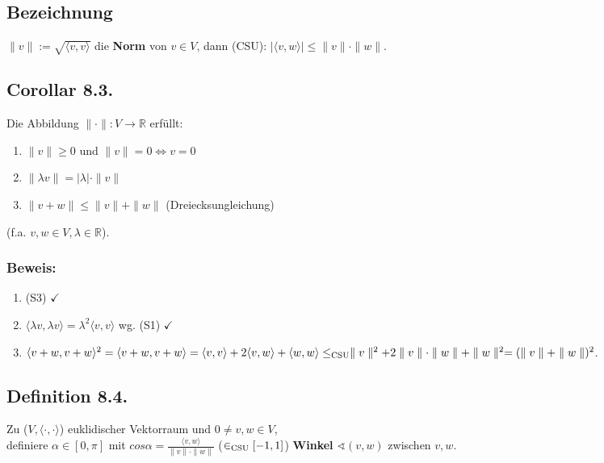 \documentclass[a4paper, 12pt]{extarticle}
\newcommand{\norm}[1]{
	\parallel #1 \parallel
}
\newcommand{\skalar}[2] {
	\langle #1, #2\rangle
}
\newcommand{\genskalar}{
	\skalar{\cdot }{\cdot }
}
\newcommand{\eskalar}[1]{
	\skalar{#1}{#1}
}
\newcommand{\tn}[1]{\textnormal {#1}}
\begin{document}
\subsection*{Bezeichnung}
$\parallel v \parallel := \sqrt{\skalar{v}{v}}$ die \textbf{Norm} von $v \in V$, dann (CSU): $|\skalar{v}{w}| \leq \parallel v\parallel \cdot \parallel w\parallel$.
\subsection*{Corollar 8.3.}
Die Abbildung $\parallel \cdot \parallel: V \longrightarrow \mathbb{R}$ erfüllt:
\begin{enumerate}[label=\alph*)]
	\item $\norm{v} \geq 0$ und $\norm{v} = 0 \Leftrightarrow v = 0$
	\item $\norm{\lambda v} = |\lambda|\cdot \norm{v}$
	\item $\norm{v+w} \leq \norm{v}+\norm{w}$ (Dreiecksungleichung)
\end{enumerate}
(f.a. $v, w \in V, \lambda \in \mathbb{R}$).
\subsubsection*{Beweis:}
\begin{enumerate}[label=\alph*)]
	\item (S3) $\checkmark$
	\item ${\skalar{\lambda v}{\lambda v}} = \lambda^2{\skalar{v}{v}}$ wg. (S1) $\checkmark$
	\item $\eskalar{v+w}^2 = {\skalar{v+w}{v+w}} = {\skalar{v}{v}}+2{\skalar{v}{w}}+{\skalar{w}{w}}\\ \leq_{\tn{CSU}} \norm{v}^2 + 2\norm{v}\cdot\norm{w}+\norm{w}^2 = (\norm{v}+\norm{w})^2$.
\end{enumerate}

\subsection*{Definition 8.4.}
Zu ($V, \genskalar$) euklidischer Vektorraum und $0 \neq v, w \in V$,\\ definiere $\alpha \in [0, \pi]$ mit $cos \alpha = \frac{\skalar{v}{w}}{\norm{v}\cdot\norm{w}}$ ($\in_{\tn{CSU}} [-1, 1]$)
\textbf{Winkel} $\sphericalangle(v, w)$ zwischen $v, w$.
\newpage
\end{document}
